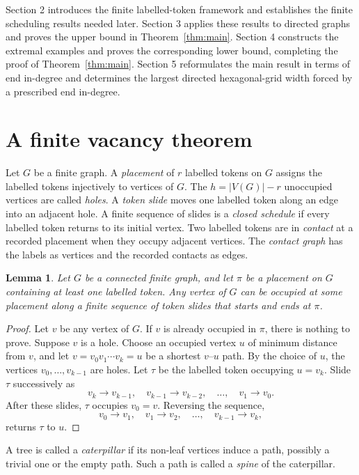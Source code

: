 \documentclass[11pt]{article}
\newtheorem{lemma}[theorem]{Lemma}
\theoremstyle{remark}
\numberwithin{equation}{section}
\begin{document}
Section 2 introduces the finite labelled-token framework and establishes the finite scheduling results needed later. Section 3 applies these results to directed graphs and proves the upper bound in Theorem~\ref{thm:main}. Section 4 constructs the extremal examples and proves the corresponding lower bound, completing the proof of Theorem~\ref{thm:main}. Section 5 reformulates the main result in terms of end in-degree and determines the largest directed hexagonal-grid width forced by a prescribed end in-degree.

\section{A finite vacancy theorem}

Let $G$ be a finite graph. A \emph{placement} of $r$ labelled tokens on $G$ assigns the labelled tokens injectively to vertices of $G$. The $h=|V(G)|-r$ unoccupied vertices are called \emph{holes}. A \emph{token slide} moves one labelled token along an edge into an adjacent hole. A finite sequence of slides is a \emph{closed schedule} if every labelled token returns to its initial vertex. Two labelled tokens are in \emph{contact} at a recorded placement when they occupy adjacent vertices. The \emph{contact graph} has the labels as vertices and the recorded contacts as edges.

\begin{lemma}\label{lem:occupation}
Let $G$ be a connected finite graph, and let $\pi$ be a placement on $G$ containing at least one labelled token. Any vertex of $G$ can be occupied at some placement along a finite sequence of token slides that starts and ends at $\pi$.
\end{lemma}

\begin{proof}
Let $v$ be any vertex of $G$. If $v$ is already occupied in $\pi$, there is nothing to prove. Suppose $v$ is a hole. Choose an occupied vertex $u$ of minimum distance from $v$, and let $v=v_0v_1\cdots v_k=u$ be a shortest $v$--$u$ path. By the choice of $u$, the vertices $v_0,\ldots,v_{k-1}$ are holes. Let $\tau$ be the labelled token occupying $u=v_k$. Slide $\tau$ successively as
\[
v_k\to v_{k-1},\quad
v_{k-1}\to v_{k-2},\quad
\ldots,\quad
v_1\to v_0.
\]
After these slides, $\tau$ occupies $v_0=v$. Reversing the sequence,
\[
v_0\to v_1,\quad
v_1\to v_2,\quad
\ldots,\quad
v_{k-1}\to v_k,
\]
returns $\tau$ to $u$.
\end{proof}

A tree is called a \emph{caterpillar} if its non-leaf vertices induce a path, possibly a trivial one or the empty path. Such a path is called a \emph{spine} of the caterpillar.
\end{document}
